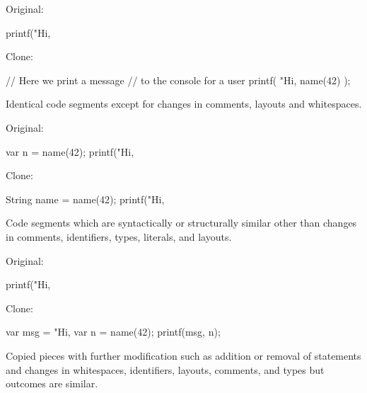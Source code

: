 \documentclass{article}
\begin{document}
\begin{multicols}{2}
Original:\par
{\small\begin{ffcode}
printf("Hi, %
\end{ffcode}
}
Clone:\par
{\small\begin{ffcode}
// Here we print a message
// to the console for a user
printf(
  "Hi, %
  name(42)
);
\end{ffcode}
}
\par\columnbreak\par
Identical code segments except for changes in comments, layouts and whitespaces.
\end{multicols}
\plush{}

\begin{multicols}{2}
Original:\par
{\small\begin{ffcode}
var n = name(42);
printf("Hi, %
\end{ffcode}
}
Clone:\par
{\small\begin{ffcode}
String name = name(42);
printf("Hi, %
\end{ffcode}
}
\par\columnbreak\par
Code segments which are syntactically or structurally similar other than changes in comments, identifiers, types, literals, and layouts.
\end{multicols}
\plush{}

\begin{multicols}{2}
Original:\par
{\small\begin{ffcode}
printf("Hi, %
\end{ffcode}
}
Clone:\par
{\small\begin{ffcode}
var msg = "Hi, %
var n = name(42);
printf(msg, n);
\end{ffcode}
}
\par\columnbreak\par
Copied pieces with further modification such as addition or removal of statements and changes in whitespaces, identifiers, layouts, comments, and types but outcomes are similar.
\end{multicols}
\plush{}
\end{document}
